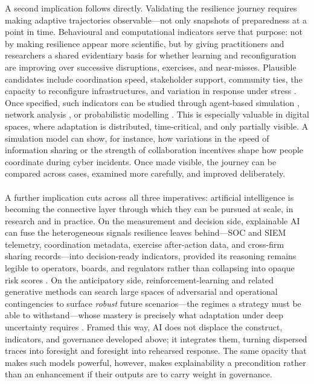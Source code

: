 A second implication follows directly. Validating the resilience journey requires making adaptive trajectories observable---not only snapshots of preparedness at a point in time. Behavioural and computational indicators serve that purpose: not by making resilience appear more scientific, but by giving practitioners and researchers a shared evidentiary basis for whether learning and reconfiguration are improving over successive disruptions, exercises, and near-misses. Plausible candidates include coordination speed, stakeholder support, community ties, the capacity to reconfigure infrastructures, and variation in response under stress \autocite{paries2017resilience,gillard2023efficient}. Once specified, such indicators can be studied through agent-based simulation \autocite{helbing2012agent}, network analysis \autocite{panteli2017metrics}, or probabilistic modelling \autocite{kruk2017building}. This is especially valuable in digital spaces, where adaptation is distributed, time-critical, and only partially visible. A simulation model can show, for instance, how variations in the speed of information sharing or the strength of collaboration incentives shape how people coordinate during cyber incidents. Once made visible, the journey can be compared across cases, examined more carefully, and improved deliberately.\\
\\
A further implication cuts across all three imperatives: artificial intelligence is becoming the connective layer through which they can be pursued at scale, in research and in practice. On the measurement and decision side, explainable AI can fuse the heterogeneous signals resilience leaves behind---SOC and SIEM telemetry, coordination metadata, exercise after-action data, and cross-firm sharing records---into decision-ready indicators, provided its reasoning remains legible to operators, boards, and regulators rather than collapsing into opaque risk scores \autocite{berente2021managing,gillard2023efficient}. On the anticipatory side, reinforcement-learning and related generative methods can search large spaces of adversarial and operational contingencies to surface \emph{robust} future scenarios---the regimes a strategy must be able to withstand---whose mastery is precisely what adaptation under deep uncertainty requires \autocite{kwakkel2016comparing,lempert2019robust}. Framed this way, AI does not displace the construct, indicators, and governance developed above; it integrates them, turning dispersed traces into foresight and foresight into rehearsed response. The same opacity that makes such models powerful, however, makes explainability a precondition rather than an enhancement if their outputs are to carry weight in governance.\\

